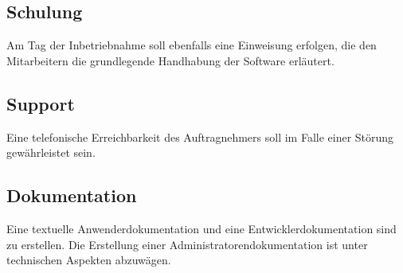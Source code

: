 \documentclass[12pt]{article}
\begin{document}
\subsection{Schulung}
Am Tag der Inbetriebnahme soll ebenfalls eine Einweisung erfolgen, die den Mitarbeitern die grundlegende Handhabung der Software erläutert.

\subsection{Support}
Eine telefonische Erreichbarkeit des Auftragnehmers soll im Falle einer Störung gewährleistet sein.

\subsection{Dokumentation}
Eine textuelle Anwenderdokumentation und eine Entwicklerdokumentation sind zu erstellen. Die Erstellung einer Administratorendokumentation ist unter technischen Aspekten abzuwägen.\\



\newpage
\clearpage
\printglossaries
\end{document}
